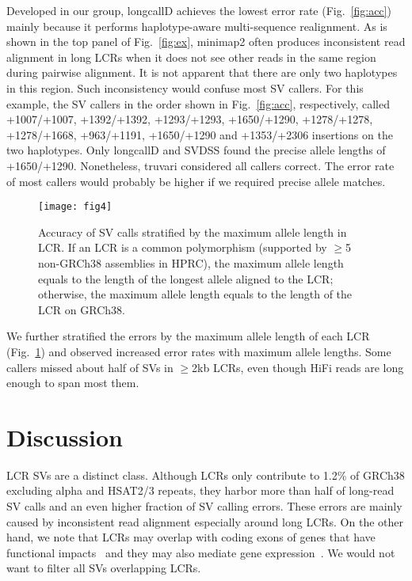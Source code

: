 \documentclass[a4paper,num-refs]{oup-contemporary}
\begin{document}
Developed in our group, longcallD achieves the lowest error rate (Fig.~\ref{fig:acc})
mainly because it performs haplotype-aware multi-sequence realignment.
As is shown in the top panel of Fig.~\ref{fig:ex}, minimap2 often produces inconsistent read alignment in long LCRs
when it does not see other reads in the same region during pairwise alignment.
It is not apparent that there are only two haplotypes in this region.
Such inconsistency would confuse most SV callers.
For this example, the SV callers in the order shown in Fig.~\ref{fig:acc}, respectively, called
+1007/+1007, +1392/+1392, +1293/+1293, +1650/+1290, +1278/+1278,
+1278/+1668, +963/+1191, +1650/+1290 and +1353/+2306 insertions on the two haplotypes.
Only longcallD and SVDSS found the precise allele lengths of +1650/+1290.
Nonetheless, truvari considered all callers correct.
The error rate of most callers would probably be higher if we required precise allele matches.


\begin{figure}[tb]
\texttt{[image: fig4]}
\caption{Accuracy of SV calls stratified by the maximum allele length in LCR.
If an LCR is a common polymorphism (supported by $\ge$5 non-GRCh38 assemblies in HPRC),
the maximum allele length equals to the length of the longest allele aligned to the LCR;
otherwise, the maximum allele length equals to the length of the LCR on GRCh38.
}\label{fig:len}
\end{figure}

We further stratified the errors by the maximum allele length of each LCR (Fig.~\ref{fig:len})
and observed increased error rates with maximum allele lengths.
Some callers missed about half of SVs in $\ge$2kb LCRs,
even though HiFi reads are long enough to span most them.

\section{Discussion}

LCR SVs are a distinct class.
Although LCRs only contribute to 1.2\% of GRCh38 excluding alpha and HSAT2/3 repeats,
they harbor more than half of long-read SV calls and an even higher fraction of SV calling errors.
These errors are mainly caused by inconsistent read alignment especially around long LCRs.
On the other hand, we note that LCRs may overlap with coding exons of genes that have functional impacts~\cite{Mukamel:2021aa}
and they may
also mediate gene expression~\cite{Bakhtiari:2021aa,Lu:2023aa}.
We would not want to filter all SVs overlapping LCRs.
\end{document}
